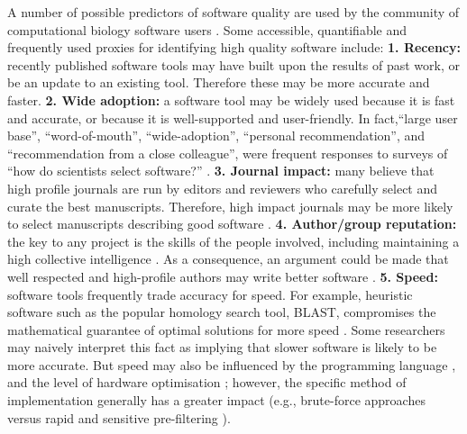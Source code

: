 \documentclass{bmcart}
\begin{document}
A number of possible predictors of software quality are used by the
community of computational biology software users \cite{Hannay2009-cf,Joppa2013-vj,Loman2015-bw}. 
Some accessible, quantifiable and frequently used proxies for identifying high quality
software include: \textbf{1. Recency:} recently published software
tools may have built upon the results of past work, or be an update to
an existing tool. Therefore these may be more accurate and
faster. \textbf{2. Wide adoption:} a software tool may be widely used
because it is fast and accurate, or because it is well-supported and
user-friendly. In fact,``large user base'', ``word-of-mouth'',
``wide-adoption'', ``personal recommendation'', and ``recommendation from a
close colleague'', were frequent responses to surveys of ``how do
scientists select software?''
\cite{Hannay2009-cf,Joppa2013-vj,Loman2015-bw}. \textbf{3. Journal
impact:} {\color{black}many believe that} high profile journals are run by editors and reviewers who
carefully select and curate the best manuscripts. Therefore, high
impact journals may be more likely to select manuscripts describing
good software \cite{Garfield1955-wf}. \textbf{4. Author/group
reputation:} the key to any project is the skills of the people
involved, including maintaining a high collective intelligence
\cite{Joppa2013-vj,Woolley2010-ld,Cheruvelil2014-xn}. As a
consequence, an argument could be made that well respected and
high-profile authors may write better software
\cite{Hirsch2005-mt,Bornmann2008-il}. \textbf{5. Speed:} software tools
frequently trade accuracy for speed. For example, heuristic
software such as the popular homology search tool, BLAST, compromises
the mathematical guarantee of optimal solutions for more speed
\cite{Altschul1990-ht,Altschul1997-ga}. Some researchers may naively
interpret this fact as implying that slower software is likely to be more
accurate. But speed may also be influenced by the programming language
\cite{Fourment2008-vl}, and the level of hardware optimisation
\cite{Farrar2007-ky,Dematte2010-ph};
{\color{black}however}, the specific method of implementation generally has a greater impact (e.g., brute-force approaches versus
rapid and sensitive pre-filtering
\cite{Schaeffer1989-mu,Papadimitriou_undated-bo,leiserson2020there}).
\end{document}
